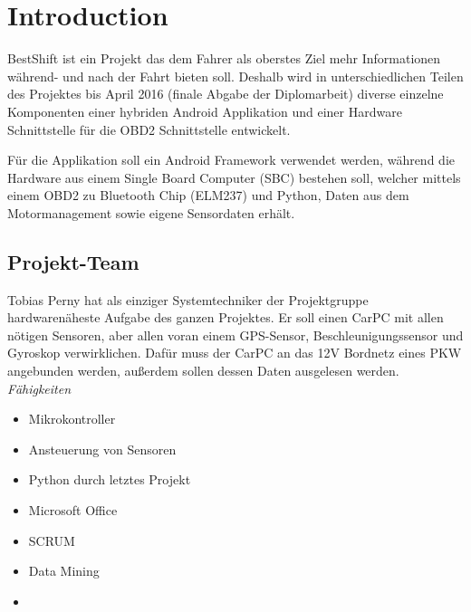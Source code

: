 \chapter{Introduction}
BestShift ist ein Projekt das dem Fahrer als oberstes Ziel mehr Informationen während- und nach der Fahrt bieten soll. Deshalb wird in unterschiedlichen Teilen des Projektes bis April 2016 (finale Abgabe der Diplomarbeit) diverse einzelne Komponenten einer hybriden Android Applikation und einer Hardware Schnittstelle für die OBD2 Schnittstelle entwickelt. 

Für die Applikation soll ein Android Framework verwendet werden, während die Hardware aus einem Single Board Computer (SBC) bestehen soll, welcher mittels einem OBD2 zu Bluetooth Chip (ELM237) und Python, Daten aus dem Motormanagement sowie eigene Sensordaten erhält. 

\section{Projekt-Team}
Tobias Perny hat als einziger Systemtechniker der Projektgruppe hardwarenäheste Aufgabe des ganzen Projektes. Er soll einen CarPC mit allen nötigen Sensoren, aber allen voran einem GPS-Sensor, Beschleunigungssensor und Gyroskop verwirklichen. Dafür muss der CarPC an das 12V Bordnetz eines PKW angebunden werden, außerdem sollen dessen Daten ausgelesen werden. 
\textit{Fähigkeiten}
\begin{itemize}
	\item Mikrokontroller
	\item Ansteuerung von Sensoren		
	\item Python durch letztes Projekt
	\item Microsoft Office
	\item SCRUM
	\item Data Mining
	\item {}
\end{itemize}

